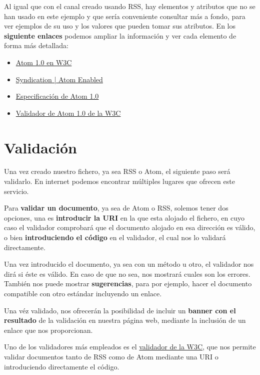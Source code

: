 Al igual que con el canal creado usando RSS, hay elementos y atributos que no se han usado en este ejemplo y que sería conveniente consultar más a fondo, para ver ejemplos de su uso y los valores que pueden tomar sus atributos. En los \textbf{siguiente enlaces} podemos ampliar la información y ver cada elemento de forma más detallada:

\begin{itemize}
    \item \href{https://validator.w3.org/feed/docs/atom.html}{Atom 1.0 en W3C}
    \item \href{http://atomenabled.org/developers/syndication/}{Syndication | Atom Enabled}
    \item \href{https://tools.ietf.org/html/rfc4287}{Especificación de Atom 1.0}
    \item \href{https://validator.w3.org/feed/#validate\_by_input}{Validador de Atom 1.0 de la W3C}
\end{itemize}

\section{Validación}
Una vez creado nuestro fichero, ya sea RSS o Atom, el siguiente paso será validarlo. En internet podemos encontrar múltiples lugares que ofrecen este servicio.

Para \textbf{validar un documento}, ya sea de Atom o RSS, solemos tener dos opciones, una es \textbf{introducir la URI} en la que esta alojado el fichero, en cuyo caso el validador comprobará que el documento alojado en esa dirección es válido, o bien \textbf{introduciendo el código} en el validador, el cual nos lo validará directamente.

Una vez introducido el documento, ya sea con un método u otro, el validador nos dirá si éste es válido. En caso de que no sea, nos mostrará cuales son los errores. También nos puede mostrar \textbf{sugerencias}, para por ejemplo, hacer el documento compatible con otro estándar incluyendo un enlace.

Una véz validado, nos ofrecerán la posibilidad de incluir un \textbf{banner con el resultado} de la validación en nuestra página web, mediante la inclusión de un enlace que nos proporcionan.

Uno de los validadores más empleados es el \href{https://validator.w3.org/feed/}{validador de la W3C}, que nos permite validar documentos tanto de RSS como de Atom mediante una URI o introduciendo directamente el código.

